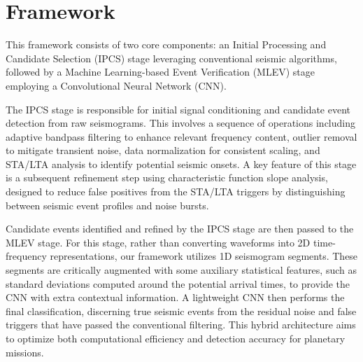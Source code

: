 \documentclass[conference]{IEEEtran}
\begin{document}


\section{Framework}
This framework consists of two core components: an Initial Processing and Candidate
Selection (IPCS) stage leveraging conventional seismic algorithms, followed by a Machine Learning-based Event
Verification (MLEV) stage employing a Convolutional Neural Network (CNN).

The IPCS stage is responsible for initial signal conditioning and candidate event detection from raw seismograms. This
involves a sequence of operations including adaptive bandpass filtering to enhance relevant frequency content, outlier
removal to mitigate transient noise, data normalization for consistent scaling, and STA/LTA analysis to identify
potential seismic onsets. A key feature of this stage is a subsequent refinement step using characteristic function
slope analysis, designed to reduce false positives from the STA/LTA triggers by distinguishing between seismic event
profiles and noise bursts.

Candidate events identified and refined by the IPCS stage are then passed to the MLEV stage. For this stage, rather than
converting waveforms into 2D time-frequency representations, our framework utilizes 1D seismogram segments. These
segments are critically augmented with some auxiliary statistical features, such as standard deviations computed around
the potential arrival times, to provide the CNN with extra contextual information. A lightweight CNN then performs the
final classification, discerning true seismic events from the residual noise and false triggers that have passed the
conventional filtering. This hybrid architecture aims to optimize both computational efficiency and detection accuracy
for planetary missions.
    
\end{document}
